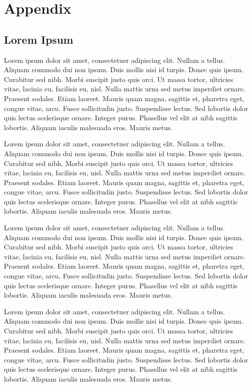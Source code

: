 \chapter{Appendix}
\label{a:appendix}

\section{Lorem Ipsum}
Lorem ipsum dolor sit amet, consectetuer adipiscing elit. Nullam a tellus.
Aliquam commodo dui non ipsum. Duis mollis nisi id turpis. Donec quis ipsum.
Curabitur sed nibh. Morbi suscipit justo quis orci. Ut massa tortor, ultricies
vitae, lacinia eu, facilisis eu, nisl. Nulla mattis urna sed metus imperdiet
ornare. Praesent sodales. Etiam laoreet. Mauris quam magna, sagittis et,
pharetra eget, congue vitae, arcu. Fusce sollicitudin justo. Suspendisse
lectus. Sed lobortis dolor quis lectus scelerisque ornare. Integer purus.
Phasellus vel elit at nibh sagittis lobortis. Aliquam iaculis malesuada eros.
Mauris metus.

Lorem ipsum dolor sit amet, consectetuer adipiscing elit. Nullam a tellus.
Aliquam commodo dui non ipsum. Duis mollis nisi id turpis. Donec quis ipsum.
Curabitur sed nibh. Morbi suscipit justo quis orci. Ut massa tortor, ultricies
vitae, lacinia eu, facilisis eu, nisl. Nulla mattis urna sed metus imperdiet
ornare. Praesent sodales. Etiam laoreet. Mauris quam magna, sagittis et,
pharetra eget, congue vitae, arcu. Fusce sollicitudin justo. Suspendisse
lectus. Sed lobortis dolor quis lectus scelerisque ornare. Integer purus.
Phasellus vel elit at nibh sagittis lobortis. Aliquam iaculis malesuada eros.
Mauris metus.

Lorem ipsum dolor sit amet, consectetuer adipiscing elit. Nullam a tellus.
Aliquam commodo dui non ipsum. Duis mollis nisi id turpis. Donec quis ipsum.
Curabitur sed nibh. Morbi suscipit justo quis orci. Ut massa tortor, ultricies
vitae, lacinia eu, facilisis eu, nisl. Nulla mattis urna sed metus imperdiet
ornare. Praesent sodales. Etiam laoreet. Mauris quam magna, sagittis et,
pharetra eget, congue vitae, arcu. Fusce sollicitudin justo. Suspendisse
lectus. Sed lobortis dolor quis lectus scelerisque ornare. Integer purus.
Phasellus vel elit at nibh sagittis lobortis. Aliquam iaculis malesuada eros.
Mauris metus.

Lorem ipsum dolor sit amet, consectetuer adipiscing elit. Nullam a tellus.
Aliquam commodo dui non ipsum. Duis mollis nisi id turpis. Donec quis ipsum.
Curabitur sed nibh. Morbi suscipit justo quis orci. Ut massa tortor, ultricies
vitae, lacinia eu, facilisis eu, nisl. Nulla mattis urna sed metus imperdiet
ornare. Praesent sodales. Etiam laoreet. Mauris quam magna, sagittis et,
pharetra eget, congue vitae, arcu. Fusce sollicitudin justo. Suspendisse
lectus. Sed lobortis dolor quis lectus scelerisque ornare. Integer purus.
Phasellus vel elit at nibh sagittis lobortis. Aliquam iaculis malesuada eros.
Mauris metus.

